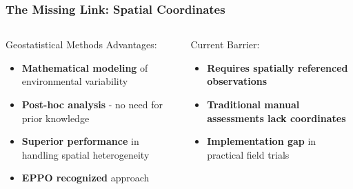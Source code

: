 \documentclass[aspectratio=43]{beamer}
\begin{document}
\begin{frame}
    \frametitle{The Missing Link: Spatial Coordinates}
    
    \begin{columns}
        \begin{column}{0.5\textwidth}
            \begin{block}{Geostatistical Methods Advantages:}
                \begin{itemize}
                    \item[\textcolor{green}{\checkmark}] \textbf{Mathematical modeling} of environmental variability
                    \item[\textcolor{green}{\checkmark}] \textbf{Post-hoc analysis} - no need for prior knowledge
                    \item[\textcolor{green}{\checkmark}] \textbf{Superior performance} in handling spatial heterogeneity
                    \item[\textcolor{green}{\checkmark}] \textbf{EPPO recognized} approach
                \end{itemize}
            \end{block}
        \end{column}
        
        \begin{column}{0.5\textwidth}
            \begin{alertblock}{Current Barrier:}
                \begin{itemize}
                    \item[\textcolor{red}{\times}] \textbf{Requires spatially referenced observations}
                    \item[\textcolor{red}{\times}] \textbf{Traditional manual assessments lack coordinates}
                    \item[\textcolor{red}{\times}] \textbf{Implementation gap} in practical field trials
                \end{itemize}
            \end{alertblock}
        \end{column}
    \end{columns}
\end{frame}
\end{document}
